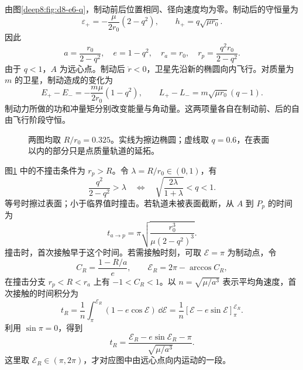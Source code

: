 \begin{solution}
由图\ref{deep8:fig:d8-e6-q}，制动前后位置相同、径向速度均为零。制动后的守恒量为
\[
 \varepsilon_+=-\frac{\mu}{2r_0}(2-q^2),\qquad
 h_+=q\sqrt{\mu r_0}.
\]
因此
\[
 a=\frac{r_0}{2-q^2},\quad e=1-q^2,\quad
 r_a=r_0,\quad r_p=\frac{q^2r_0}{2-q^2}.
\]
由于 $q<1$，$A$ 为远心点。制动后 $\ddot r<0$，卫星先沿新的椭圆向内飞行。对质量为 $m$ 的卫星，制动造成的变化为
\[
 E_+-E_-=-\frac{m\mu}{2r_0}(1-q^2),\qquad
 L_+-L_-=m\sqrt{\mu r_0}(q-1).
\]
制动力所做的功和冲量矩分别改变能量与角动量。这两项量各自在制动前、后的自由飞行阶段守恒。
\begin{figure}[H]\centering
{}
\caption{两图均取 $R/r_0=0.325$。实线为擦边椭圆；虚线取 $q=0.6$，在表面以内的部分只是点质量轨道的延拓。}\label{deep8:fig:d8-e6-s}
\end{figure}
图\ref{deep8:fig:d8-e6-s} 中的不撞击条件为 $r_p>R$。令 $\lambda=R/r_0\in(0,1)$，有
\[
 \frac{q^2}{2-q^2}>\lambda
 \quad\Longleftrightarrow\quad
 \boxed{\sqrt{\frac{2\lambda}{1+\lambda}}<q<1}.
\]
等号时擦过表面；小于临界值时撞击。若轨道未被表面截断，从 $A$ 到 $P_p$ 的时间为
\[
 t_{a\to p}=\pi\sqrt{\frac{r_0^3}{\mu(2-q^2)^3}}.
\]
撞击时，首次接触早于这个时间。若需接触时刻，可取 $\mathcal E=\pi$ 为制动点，令
\[
 C_R=\frac{1-R/a}{e},\qquad
 \mathcal E_R=2\pi-\arccos C_R,
\]
在撞击分支 $r_p<R<r_a$ 上有 $-1<C_R<1$。以 $n=\sqrt{\mu/a^3}$ 表示平均角速度，首次接触的时间积分为
\[
t_R=\frac1n\int_\pi^{\mathcal E_R}(1-e\cos\mathcal E)\,\dd\mathcal E
=\frac1n[\mathcal E-e\sin\mathcal E]_\pi^{\mathcal E_R}.
\]
利用 $\sin\pi=0$，得到
\[
 t_R=\frac{\mathcal E_R-e\sin\mathcal E_R-\pi}{\sqrt{\mu/a^3}}.
\]
这里取 $\mathcal E_R\in(\pi,2\pi)$，才对应图中由远心点向内运动的一段。
\end{solution}



